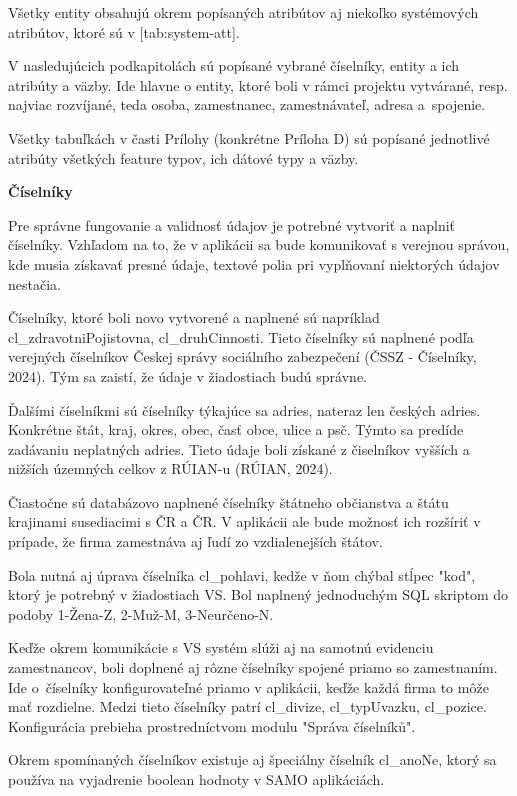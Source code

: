 Všetky entity obsahujú okrem popísaných atribútov aj niekoľko systémových atribútov, ktoré sú v [tab:system-att].


V nasledujúcich podkapitolách sú popísané vybrané číselníky, entity a ich atribúty a väzby. Ide hlavne o entity, ktoré boli v rámci projektu vytvárané, resp. najviac rozvíjané, teda osoba, zamestnanec, zamestnávateľ, adresa a~spojenie.

Všetky tabuľkách v časti Prílohy (konkrétne Príloha D) sú popísané jednotlivé atribúty všetkých feature typov, ich dátové typy a väzby.

\blank
\start
\setupindenting[no]
\start\bf Číselníky\stop
\stop

Pre správne fungovanie a validnosť údajov je potrebné vytvoriť a naplniť číselníky. Vzhľadom na to, že v aplikácii sa bude komunikovať s verejnou správou, kde musia získavať presné údaje, textové polia pri vyplňovaní niektorých údajov nestačia. 

Číselníky, ktoré boli novo vytvorené a naplnené sú napríklad cl\_zdravotniPojistovna, cl\_druhCinnosti. Tieto číselníky sú naplnené podľa verejných číselníkov Českej správy sociálního zabezpečení \scr(ČSSZ - Číselníky, 2024). Tým sa zaistí, že údaje v žiadostiach budú správne. 

Ďalšími číselníkmi sú číselníky týkajúce sa adries, nateraz len českých adries. Konkrétne štát, kraj, okres, obec, časť obce, ulice a psč. Týmto sa predíde zadávaniu neplatných adries. Tieto údaje boli získané z čiselníkov vyšších a nižších územných celkov z RÚIAN-u \scr(RÚIAN, 2024).

Čiastočne sú databázovo naplnené číselníky štátneho občianstva a štátu krajinami susediacimi s ČR a ČR. V aplikácii ale bude možnosť ich rozšíriť v prípade, že firma zamestnáva aj ľudí zo vzdialenejších štátov.

Bola nutná aj úprava číselníka cl\_pohlavi, kedže v ňom chýbal stĺpec "kod", ktorý je potrebný v žiadostiach VS. Bol naplnený jednoduchým SQL skriptom do podoby 1-Žena-Z, 2-Muž-M, 3-Neurčeno-N.

Keďže okrem komunikácie s VS systém slúži aj na samotnú evidenciu zamestnancov, boli doplnené aj rôzne číselníky spojené priamo so zamestnaním. Ide o~číselníky konfigurovateľné priamo v aplikácii, keďže každá firma to môže mať rozdielne. Medzi tieto číselníky patrí cl\_divize, cl\_typUvazku, cl\_pozice. Konfigurácia prebieha prostredníctvom modulu "Správa číselníků".

Okrem spomínaných číselníkov existuje aj špeciálny číselník cl_anoNe, ktorý sa používa na vyjadrenie boolean hodnoty v SAMO aplikáciách. 

